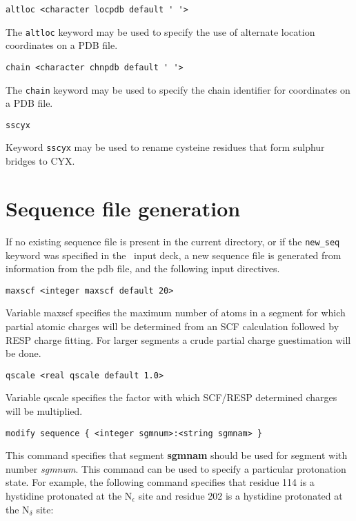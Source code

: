 \begin{verbatim}
altloc <character locpdb default ' '>
\end{verbatim}

The \verb+altloc+ keyword may be used to specify the use of alternate
location coordinates on a PDB file.

\begin{verbatim}
chain <character chnpdb default ' '>
\end{verbatim}

The \verb+chain+ keyword may be used to specify the chain identifier
for coordinates on a PDB file.

\begin{verbatim}
sscyx
\end{verbatim}

Keyword \verb+sscyx+ may be used to rename cysteine residues that form
sulphur bridges to CYX.


\section{Sequence file generation}

If no existing sequence file is present in the current directory,
or if the \verb+new_seq+ keyword was specified in the \prepare\ 
input deck, a new sequence file is generated from information
from the pdb file, and the following input directives.

\begin{verbatim}
maxscf <integer maxscf default 20>
\end{verbatim}

Variable maxscf specifies the maximum number of atoms in a segment for
which partial atomic charges will be determined from an SCF calculation
followed by RESP charge fitting. For larger segments a crude partial
charge guestimation will be done.

\begin{verbatim}
qscale <real qscale default 1.0>
\end{verbatim}

Variable qscale specifies the factor with which SCF/RESP determined
charges will be multiplied.

\begin{verbatim}
modify sequence { <integer sgmnum>:<string sgmnam> }
\end{verbatim}

This command specifies that segment {\bf sgmnam} should be used
for segment with number {\it sgmnum}. This command can be used
to specify a particular protonation state. For example, the
following command specifies that residue 114 is a hystidine
protonated at the N$_\epsilon$ site and residue 202 is a hystidine
protonated at the N$_\delta$ site:

